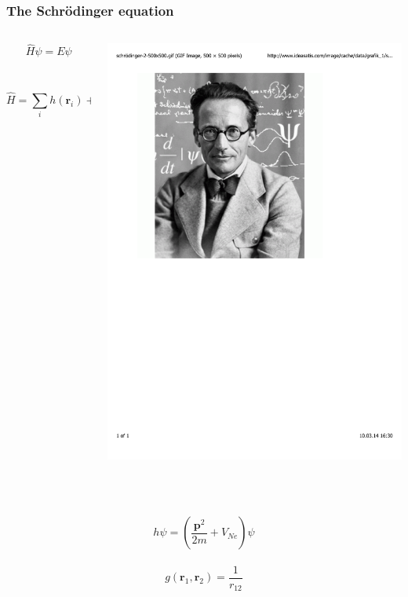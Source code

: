\documentclass[mathserif,10pt]{beamer}
\begin{document}
\begin{frame}
    \frametitle{The Schr\"{o}dinger equation}
    \begin{columns}
    \begin{column}{.50\textwidth}
	\begin{equation}
	\nonumber
	    \hat{H} \psi = E \psi
	\end{equation}
	\ \\
	\ \\
	\begin{equation}
	\nonumber
	    \hat{H} = \sum_i h(\boldsymbol{r}_i) + \frac{1}{2}\sum_{i,j} g(\boldsymbol{r}_i,\boldsymbol{r}_j)
	\end{equation}
    \end{column}
    \begin{column}{.50\textwidth}
	\centering
	\includegraphics[viewport = 90 405 400 795, clip, scale=0.23]{figures/schrodinger.pdf}
    \end{column}
    \end{columns}
    \ \\
    \ \\
    \begin{equation}
	\nonumber
        h \psi = \left(\frac{\boldsymbol{p}^2}{2m} + V_{Ne} \right) \psi
    \end{equation}
    \ \\
    \begin{equation}
	\nonumber
        g(\boldsymbol{r}_1,\boldsymbol{r}_2) = \frac{1}{r_{12}}
    \end{equation}
\end{frame}
\end{document}
